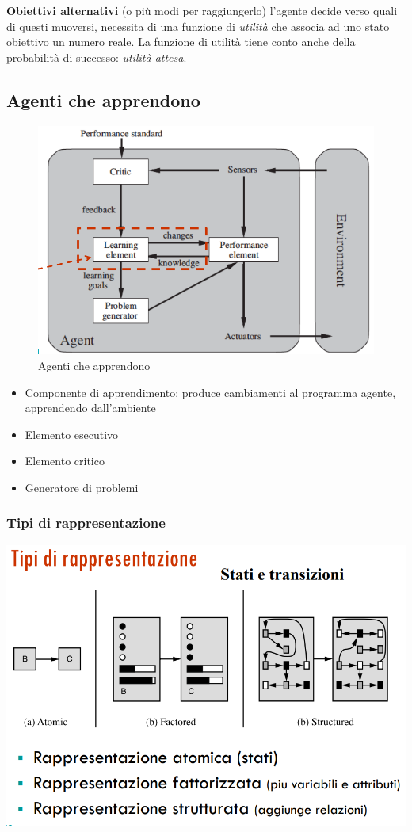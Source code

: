 \documentclass{article}
\begin{document}
\textbf{Obiettivi alternativi} (o più modi per raggiungerlo) l'agente decide verso quali di questi muoversi, necessita di una funzione di \textit{utilità} che associa ad uno stato obiettivo un numero reale. La funzione di utilità tiene conto anche della probabilità di successo: \textit{utilità attesa}.

\subsection{Agenti che apprendono}

\begin{figure}
    \centering
    \includegraphics[width =\linewidth]{9.png}
    \caption{Agenti che apprendono}
\end{figure}
\begin{itemize}
    \item Componente di apprendimento: produce cambiamenti al programma agente, apprendendo dall'ambiente
    \item Elemento esecutivo
    \item Elemento critico
    \item Generatore di problemi
\end{itemize}

\subsubsection{Tipi di rappresentazione}

\includegraphics[width=\linewidth]{7.png}
\end{document}
